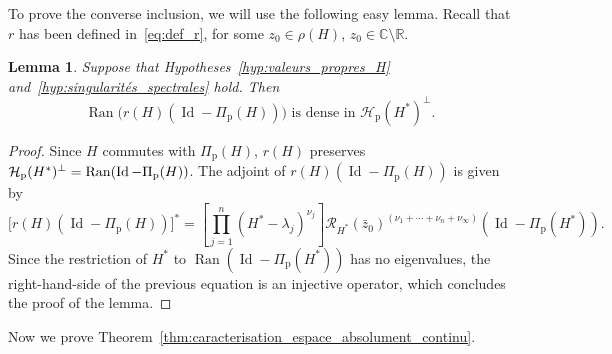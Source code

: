 \documentclass[10pt]{amsart}
\newtheorem{lemm}[theo]{Lemma}\newtheorem{prop}[theo]{Proposition}\newtheorem{coro}[theo]{Corollary}\newtheorem{conj}[theo]{Conjecture}
\theoremstyle{definition}\newtheorem{defi}[theo]{Definition}\newtheorem{rema}[theo]{Remark}\newtheorem{exam}[theo]{Example}\newtheorem{exem}[theo]{Example}\newtheorem{nota}[theo]{Notation}
\newcommand{\Hi}{\mathcal{H}}
\newcommand{\bbC}{\mathbb{C}}
\newcommand{\R}{\mathbb{R}}
\newcommand{\rmp}{\mathrm{p}}
\newcommand{\Res}{\mathcal{R}}
\DeclareMathOperator{\Ran}{Ran}
\DeclareMathOperator{\Id}{Id}
\begin{document}
To prove the converse inclusion, we will use the following easy lemma. Recall that $r$ has been defined in~\eqref{eq:def_r}, for some $z_0\in\rho(H)$, $z_0\in\bbC\setminus\R$.

\begin{lemm}\label{lm:closed_range}
Suppose that Hypotheses~\ref{hyp:valeurs_propres_H} and~\ref{hyp:singularités_spectrales} hold. Then
\begin{equation*}
\Ran\big(r(H)\left(\Id-\Pi_\rmp(H)\right)\big) \text{ is dense in } \Hi_\rmp(H^*)^\perp.
\end{equation*}
\end{lemm}

\begin{proof}
Since $H$ commutes with $\Pi_{\rmp}(H)$, $r(H)$ preserves $\Hi_\rmp(H^*)^\perp=\Ran(\Id-\linebreak\Pi_\rmp(H))$. The adjoint of $r(H)(\Id-\Pi_\rmp(H))$ is given by
\begin{equation*}
\big[r(H)\left(\Id-\Pi_\rmp(H)\right)\big]^* = \left[\prod_{j=1}^n \left(H^*-\lambda_j\right)^{\nu_j} \right] \Res_{H^*}(\bar z_0)^{(\nu_1+\cdots+\nu_n+\nu_\infty)} \left(\Id-\Pi_\rmp(H^*)\right).
\end{equation*}
Since the restriction of $H^*$ to $\Ran(\Id-\Pi_\rmp(H^*))$ has no eigenvalues, the right-hand-side of the previous equation is an injective operator, which concludes the proof of the lemma.
\end{proof}

Now we prove Theorem~\ref{thm:caracterisation_espace_absolument_continu}.
\end{document}
